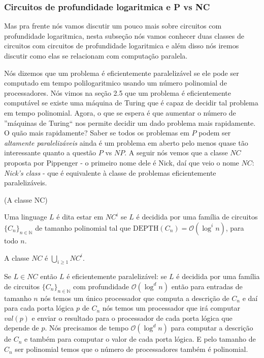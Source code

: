 \subsubsection{Circuitos de profundidade logaritmica e P vs NC}

Mas pra frente nós vamos discutir um pouco mais sobre circuitos com profundidade logaritmica, nesta subseção nós vamos conhecer duas classes de circuitos com circuitos de profundidade logaritmica e além disso nós iremos discutir como elas se relacionam com computação paralela.

Nós dizemos que um problema é eficientemente paralelizável se ele pode ser computado em tempo polilogaritmico usando um número polinomial de processadores. Nós vimos na seção 2.5 que um problema é eficientemente computável se existe uma máquina de Turing que é capaz de decidir tal problema em tempo polinomial. Agora, o que se espera é que aumentar o número de ''máquinas de Turing`` nos permite decidir um dado problema mais rapidamente. O quão mais rapidamente? Saber se todos os problemas em $P$ podem ser \emph{altamente paralelizáveis} ainda é um problema em aberto pelo menos quase tão interessante quanto a questão $P$ vs $NP$. A seguir nós vemos que a classe $NC$ proposta por Pippenger - o primeiro nome dele é Nick, daí que veio o nome $NC$: \emph{Nick's class} - que é equivalente à classe de problemas eficientemente paralelizáveis. 


\begin{defi} (A classe NC)

Uma linguage $L$ é dita estar em $NC^{i}$ se $L$ é decidida por uma família de circuitos $\{C_{n}\}_{n \in \mathbb{N}}$ de tamanho polinomial tal que $\text{DEPTH}(C_{n}) = \mathcal{O}(\log^{i} n)$, para todo $n$.

A classe $NC$ é $\bigcup_{i \geq 1}NC^{i}$.

\end{defi}

Se $L \in NC$ então $L$ é eficientemente paralelizável: se $L$ é decidida por uma família de circuitos $\{C_{n}\}_{n \in \mathbb{N}}$ com profundidade $\mathcal{O}(\log^{d}n)$ então para entradas de tamanho $n$ nós temos um único processador que computa a descrição de $C_{n}$ e daí para cada porta lógica $p$ de $C_{n}$ nós temos um processador que irá computar $val(p)$ e enviar o resultado para o processador de cada porta lógica que depende de $p$. Nós precisamos de tempo $\mathcal{O}(\log^{d}n)$ para computar a descrição de $C_{n}$ e também para computar o valor de cada porta lógica. E pelo tamanho de $C_{n}$ ser polinomial temos que o número de processadores também é polinomial.


